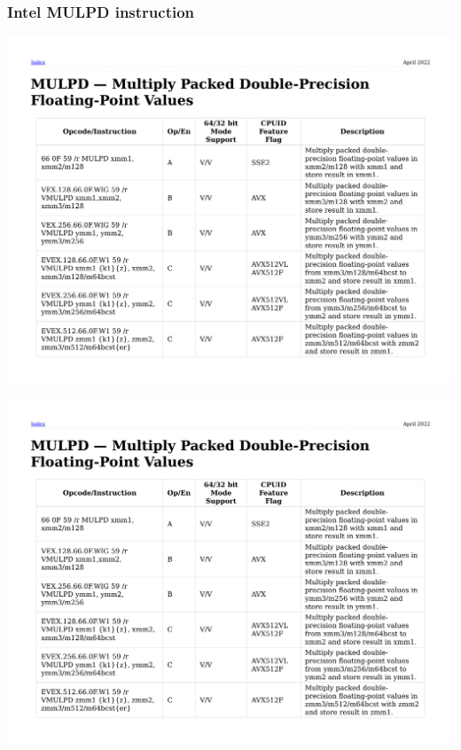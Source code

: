 \documentclass{beamer}
\begin{document}
\begin{frame}[fragile]
\frametitle{Intel MULPD instruction}
\includegraphics[page=1, clip, trim=0in 3.2in 0in 0.75in, width=\textwidth]{mulpd.pdf}

\includegraphics[page=2, clip, trim=0in 5in 0in 2.2in, width=\textwidth]{mulpd.pdf}


\end{frame}
\end{document}
